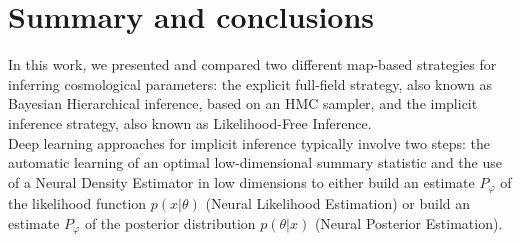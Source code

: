 \documentclass{aa}
\begin{document}
\section{Summary and conclusions}\label{Sec:conclusion}
 In this work, we presented and compared two different map-based strategies for inferring cosmological parameters: the explicit full-field strategy, also known as Bayesian Hierarchical inference, based on an HMC sampler, and the implicit inference strategy, also known as Likelihood-Free Inference. \\Deep learning approaches for implicit inference typically involve two steps: the automatic learning of an optimal low-dimensional summary statistic and the use of a Neural Density Estimator in low dimensions to either build an estimate $P_{\varphi}$ of the likelihood function $p(x|\theta)$ (Neural Likelihood Estimation) or build an estimate $P_{\varphi}$ of the posterior distribution $p(\theta|x)$ (Neural Posterior Estimation).
 
\end{document}
